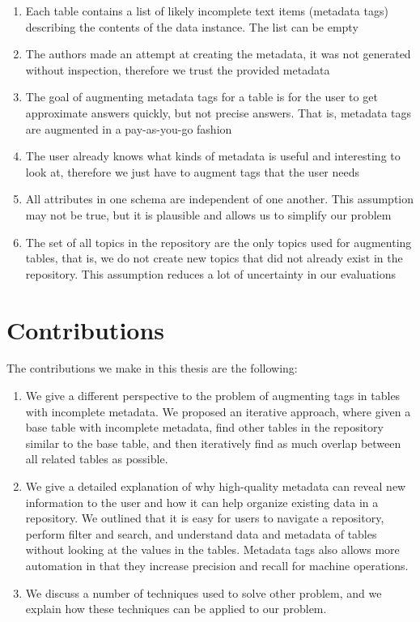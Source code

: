 \begin{enumerate}
\item Each table contains a list of likely incomplete text items (metadata tags) describing the contents of the data instance. The list can be empty
\item The authors made an attempt at creating the metadata, it was not generated without inspection, therefore we trust the provided metadata
\item The goal of augmenting metadata tags for a table is for the user to get approximate answers quickly, but not precise answers. That is, metadata tags are augmented in a pay-as-you-go fashion
\item The user already knows what kinds of metadata is useful and interesting to look at, therefore we just have to augment tags that the user needs
\item All attributes in one schema are independent of one another. This assumption may not be true, but it is plausible and allows us to simplify our problem
\item The set of all topics in the repository are the only topics used for augmenting tables, that is, we do not create new topics that did not already exist in the repository. This assumption reduces a lot of uncertainty in our evaluations	
\end{enumerate}

\section{Contributions}
\label{sec:Contributions}

The contributions we make in this thesis are the following:
\begin{enumerate}
\item We give a different perspective to the problem of augmenting tags in tables with incomplete metadata. We proposed an iterative approach, where given a base table with incomplete metadata, find other tables in the repository similar to the base table, and then iteratively find as much overlap between all related tables as possible.
\item We give a detailed explanation of why high-quality metadata can reveal new information to the user and how it can help organize existing data in a repository. We outlined that it is easy for users to navigate a repository, perform filter and search, and understand data and metadata of tables without looking at the values in the tables. Metadata tags also allows more automation in that they increase precision and recall for machine operations.
\item We discuss a number of techniques used to solve other problem, and we explain how these techniques can be applied to our problem.	
\end{enumerate}

